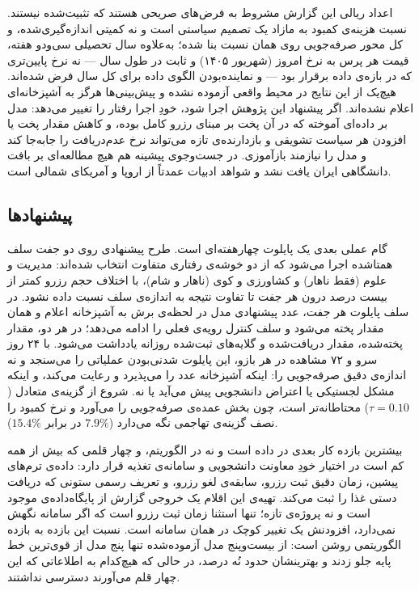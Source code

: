 اعداد ریالی این گزارش مشروط به فرض‌های صریحی هستند که تثبیت‌شده نیستند. نسبت هزینه‌ی
کمبود به مازاد یک تصمیم سیاستی است و نه کمیتی اندازه‌گیری‌شده، و کل محور صرفه‌جویی روی
همان نسبت بنا شده؛ به‌علاوه سال تحصیلی سی‌ودو هفته، قیمت هر پرس به نرخ امروز (شهریور
۱۴۰۵) و ثابت در طول سال — نه نرخ پایین‌تری که در بازه‌ی داده برقرار بود — و
نماینده‌بودن الگوی داده برای کل سال فرض شده‌اند. هیچ‌یک از این نتایج در محیط واقعی آزموده نشده و
پیش‌بینی‌ها هرگز به آشپزخانه‌ای اعلام نشده‌اند. اگر پیشنهاد این پژوهش اجرا شود، خودِ
اجرا رفتار را تغییر می‌دهد: مدل بر داده‌ای آموخته که در آن پخت بر مبنای رزرو کامل بوده،
و کاهش مقدار پخت یا افزودن هر سیاست تشویقی و بازدارنده‌ی تازه می‌تواند نرخ عدم‌دریافت را
جابه‌جا کند و مدل را نیازمند بازآموزی. در جست‌وجوی پیشینه هم هیچ مطالعه‌ای بر بافت
دانشگاهی ایران یافت نشد و شواهد ادبیات عمدتاً از اروپا و آمریکای شمالی است.

\subsection{پیشنهادها}
\label{sec:5-2-3}

گام عملی بعدی یک پایلوت چهارهفته‌ای است. طرح پیشنهادی روی دو جفت سلف همتاشده اجرا
می‌شود که از دو خوشه‌ی رفتاری متفاوت انتخاب شده‌اند: مدیریت و علوم (فقط ناهار) و
کشاورزی و کوی (ناهار و شام)، با اختلاف حجم رزرو کمتر از بیست درصد درون هر جفت تا
تفاوت نتیجه به اندازه‌ی سلف نسبت داده نشود. در سلف پایلوت هر جفت، عدد پیشنهادی مدل در
لحظه‌ی برش به آشپزخانه اعلام و همان مقدار پخته می‌شود و سلف کنترل رویه‌ی فعلی را ادامه
می‌دهد؛ در هر دو، مقدار پخته‌شده، مقدار دریافت‌شده و گلایه‌های ثبت‌شده روزانه یادداشت
می‌شود. با ۲۴ روز سرو و ۷۲ مشاهده در هر بازو، این پایلوت شدنی‌بودن عملیاتی را می‌سنجد
و نه اندازه‌ی دقیق صرفه‌جویی را: اینکه آشپزخانه عدد را می‌پذیرد و رعایت می‌کند، و اینکه
مشکل لجستیکی یا اعتراض دانشجویی پیش می‌آید یا نه. شروع از گزینه‌ی متعادل
($\tau = 0.10$) محتاطانه‌تر است، چون بخش عمده‌ی صرفه‌جویی را می‌آورد و نرخ کمبود را
نصف گزینه‌ی تهاجمی نگه می‌دارد ($7.9\%$ در برابر $15.4\%$).

بیشترین بازده کار بعدی در داده است و نه در الگوریتم، و چهار قلمی که بیش از همه کم
است در اختیار خودِ معاونت دانشجویی و سامانه‌ی تغذیه قرار دارد: داده‌ی ترم‌های پیشین،
زمان دقیق ثبت رزرو، سابقه‌ی لغو رزرو، و تعریف رسمی ستونی که دریافت دستی غذا را ثبت
می‌کند. تهیه‌ی این اقلام یک خروجی گزارش از پایگاه‌داده‌ی موجود است و نه پروژه‌ی تازه؛
تنها استثنا زمان ثبت رزرو است که اگر سامانه نگهش نمی‌دارد، افزودنش یک تغییر کوچک در
همان سامانه است. نسبت این بازده به بازده الگوریتمی روشن است: از بیست‌وپنج مدل
آزموده‌شده تنها پنج مدل از قوی‌ترین خط پایه جلو زدند و بهترینشان حدود نُه درصد، در
حالی که هیچ‌کدام به اطلاعاتی که این چهار قلم می‌آورند دسترسی نداشتند.

